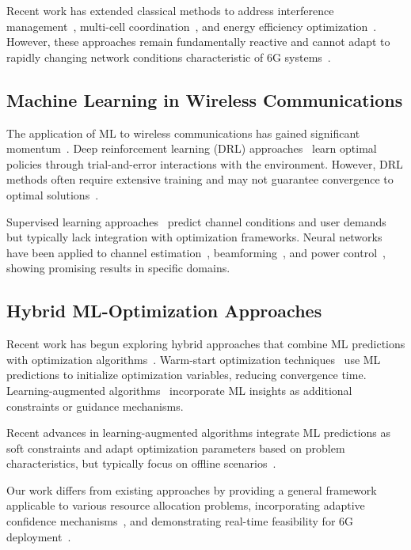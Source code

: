 \documentclass[conference]{IEEEtran}
\begin{document}
Recent work has extended classical methods to address interference management~\cite{qos_wireless}, multi-cell coordination~\cite{energy_efficient_6g}, and energy efficiency optimization~\cite{energy_efficient_6g}. However, these approaches remain fundamentally reactive and cannot adapt to rapidly changing network conditions characteristic of 6G systems~\cite{nextg_requirements}.

\subsection{Machine Learning in Wireless Communications}

The application of ML to wireless communications has gained significant momentum~\cite{ml_optimization,hybrid_systems}. Deep reinforcement learning (DRL) approaches~\cite{drl_wireless} learn optimal policies through trial-and-error interactions with the environment. However, DRL methods often require extensive training and may not guarantee convergence to optimal solutions~\cite{robust_ml}.

Supervised learning approaches~\cite{supervised_wireless} predict channel conditions and user demands but typically lack integration with optimization frameworks. Neural networks have been applied to channel estimation~\cite{channel_estimation}, beamforming~\cite{channel_estimation}, and power control~\cite{supervised_wireless}, showing promising results in specific domains.

\subsection{Hybrid ML-Optimization Approaches}

Recent work has begun exploring hybrid approaches that combine ML predictions with optimization algorithms~\cite{hybrid_systems}. Warm-start optimization techniques~\cite{warm_start_optimization} use ML predictions to initialize optimization variables, reducing convergence time. Learning-augmented algorithms~\cite{warm_start_optimization} incorporate ML insights as additional constraints or guidance mechanisms.

Recent advances in learning-augmented algorithms integrate ML predictions as soft constraints and adapt optimization parameters based on problem characteristics, but typically focus on offline scenarios~\cite{adaptive_algorithms,warm_start_optimization}.

Our work differs from existing approaches by providing a general framework applicable to various resource allocation problems, incorporating adaptive confidence mechanisms~\cite{adaptive_algorithms}, and demonstrating real-time feasibility for 6G deployment~\cite{realtime_systems}.
\end{document}
